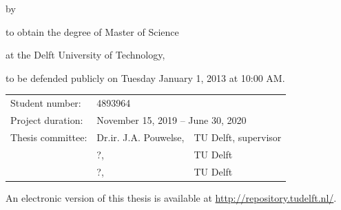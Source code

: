 \begin{titlepage}


\begin{center}


{\makeatletter
\fontsize{64}{64}\selectfont\@title\par
\makeatother}

\bigskip

{\makeatletter
\ifx\@subtitle\undefined\else
    \bigskip
   {\fontsize{32}{42}\selectfont\@subtitle\par}
\fi
\makeatother}

\bigskip
\bigskip

by

\bigskip
\bigskip

{\makeatletter
\fontsize{26}{26}\selectfont\@author
\makeatother}

\bigskip
\bigskip

to obtain the degree of Master of Science

at the Delft University of Technology,

to be defended publicly on Tuesday January 1, 2013 at 10:00 AM.

\vfill

\begin{tabular}{lll}
    Student number: & 4893964 \\
    Project duration: & \multicolumn{2}{l}{November 15, 2019 -- June 30, 2020} \\
    Thesis committee: & Dr.ir. J.A. Pouwelse, & TU Delft, supervisor \\
        & ?, & TU Delft \\
        & ?, & TU Delft
\end{tabular}

\bigskip
\bigskip

\bigskip
\bigskip
An electronic version of this thesis is available at \url{http://repository.tudelft.nl/}.


\end{center}
\end{titlepage}
